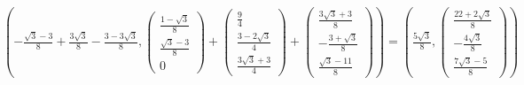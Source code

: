 \documentclass{article} %
\begin{document}
$ (- \frac{\sqrt{3} - 3}{8} + \frac{3 \sqrt{3}}{8} - \frac{3 - 3 \sqrt{3}}{8}, \begin{pmatrix}
\frac{1 - \sqrt{3}}{8} \\
\frac{\sqrt{3} - 3}{8} \\
0
\end{pmatrix} + \begin{pmatrix}
\frac{9}{4} \\
\frac{3 - 2\sqrt{3}}{4} \\
\frac{3\sqrt{3} + 3}{4}
\end{pmatrix} + \begin{pmatrix}
\frac{3\sqrt{3} + 3}{8} \\
- \frac{3 + \sqrt{3}}{8} \\
\frac{\sqrt{3} - 11}{8}
\end{pmatrix}) = (\frac{5\sqrt{3}}{8}, \begin{pmatrix}
\frac{22 + 2\sqrt{3}}{8} \\
- \frac{4\sqrt{3}}{8} \\
\frac{7\sqrt{3} - 5}{8}
\end{pmatrix})$
\end{document}
